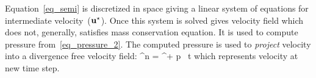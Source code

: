 Equation~\ref{eq_semi} is discretized in space giving a linear system
of equations for intermediate velocity~(${\bf u}^\star$). Once this
system is solved gives velocity field which does not, generally, 
satisfies mass conservation equation. It is used to compute pressure 
from~\ref{eq_pressure_2}. The computed pressure is used to {\em project}
velocity into a divergence free velocity field:
%
\be
  \uvw^{n} = \uvw^\s +  \nabla p \, \Delta t
  \label{eq_projection}
\ee
%
which represents velocity at new time step. 


